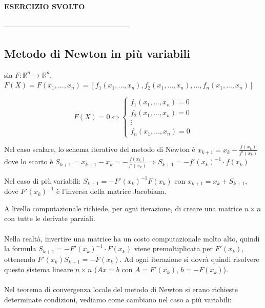 \documentclass[a4paper, 11pt]{article}
\begin{document}
        \paragraph{ESERCIZIO SVOLTO}

        -----------------------------------------------------



        \subsection{Metodo di Newton in più variabili}

        sia $F: \mathbb{R}^n \rightarrow \mathbb{R}^n$, $F(X) = F(x_1, ..., x_n) = [f_1(x_1, ..., x_n), f_2(x_1, ..., x_n), ..., f_n(x_1, ..., x_n)]$

        \[
        F(X) = 0 \Leftrightarrow \begin{cases}
        f_1(x_1, ..., x_n) = 0 \\
        f_2(x_1, ..., x_n) = 0 \\
        \vdots \\
        f_n(x_1, ..., x_n) = 0
        \end{cases}
        \]

        Nel caso scalare, lo schema iterativo del metodo di Newton è $x_{k+1} = x_k - \frac{f(x_k)}{f'(x_k)}$ dove lo scarto è $S_{k+1} = x_{k+1} - x_k = - \frac{f(x_k)}{f'(x_k)} \Rightarrow S_{k+1} = - f'(x_k)^{-1} \cdot f(x_k)$

        Nel caso di più variabili: $S_{k+1} = - F'(x_k)^{-1} F(x_k)$ con $x_{k+1} = x_k + S_{k+1}$, dove $F'(x_k)^{-1}$ è l'inversa della matrice Jacobiana.

        A livello computazionale richiede, per ogni iterazione, di creare una matrice $n \times n$ con tutte le derivate parziali.

        \paragraph{}
        Nella realtà, invertire una matrice ha un costo computazionale molto alto, quindi la formula $S_{k+1} = -F'(x_k)^{-1} \cdot F(x_k)$ viene premoltiplicata per $F'(x_k)$, ottenendo $F'(x_k) S_{k+1} = -F(x_k)$. Ad ogni iterazione si dovrà quindi risolvere questo sistema lineare $n \times n$ ($Ax = b$ con $A = F'(x_k)$, $b = -F(x_k)$).

        \paragraph{}
        Nel teorema di convergenza locale del metodo di Newton si erano richieste determinate condizioni, vediamo come cambiano nel caso a più variabili:
\end{document}
